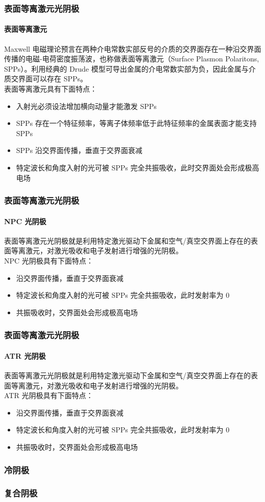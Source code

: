 \documentclass[ignorenonframetext, t]{beamer}
\begin{document}
\begin{frame}[label=current]
	\frametitle{表面等离激元光阴极}
	\framesubtitle{表面等离激元}
	Maxwell 电磁理论预言在两种介电常数实部反号的介质的交界面存在一种沿交界面传播的电磁-电荷密度振荡波，也称做\alert{表面等离激元（Surface Plasmon Polaritons, SPPs）}。利用经典的 Drude 模型可导出金属的介电常数实部为负，因此金属与介质交界面可以存在 SPPs。\\[10pt]
	
	表面等离激元具有下面特点：
	\begin{itemize}
	\item 入射光必须设法增加横向动量才能激发 SPPs
	\item SPPs 存在一个特征频率，等离子体频率低于此特征频率的金属表面才能支持 SPPs
	\item SPPs 沿交界面传播，垂直于交界面衰减
	\item 特定波长和角度入射的光可被 SPPs \alert{完全共振吸收}，此时交界面处会形成\alert{极高电场}
	\end{itemize}
\end{frame}

\begin{frame}[label=current]
	\frametitle{表面等离激元光阴极}
	\framesubtitle{NPC 光阴极}
	表面等离激元光阴极就是利用特定激光驱动下金属和空气/真空交界面上存在的表面等离激元，对激光吸收和电子发射进行增强的光阴极。\\[10pt]
	
	NPC 光阴极具有下面特点：
	\begin{itemize}
	\item 沿交界面传播，垂直于交界面衰减
	\item 特定波长和角度入射的光可被 SPPs 完全共振吸收，此时发射率为 0
	\item 共振吸收时，交界面处会形成极高电场
	\end{itemize}
\end{frame}

\begin{frame}[label=current]
	\frametitle{表面等离激元光阴极}
	\framesubtitle{ATR 光阴极}
	表面等离激元光阴极就是利用特定激光驱动下金属和空气/真空交界面上存在的表面等离激元，对激光吸收和电子发射进行增强的光阴极。\\[10pt]
	
	ATR 光阴极具有下面特点：
	\begin{itemize}
	\item 沿交界面传播，垂直于交界面衰减
	\item 特定波长和角度入射的光可被 SPPs 完全共振吸收，此时发射率为 0
	\item 共振吸收时，交界面处会形成极高电场
	\end{itemize}
\end{frame}

\begin{frame}[label=current]
	\frametitle{冷阴极}
\end{frame}

\begin{frame}[label=current]
	\frametitle{复合阴极}
\end{frame}
\end{document}
